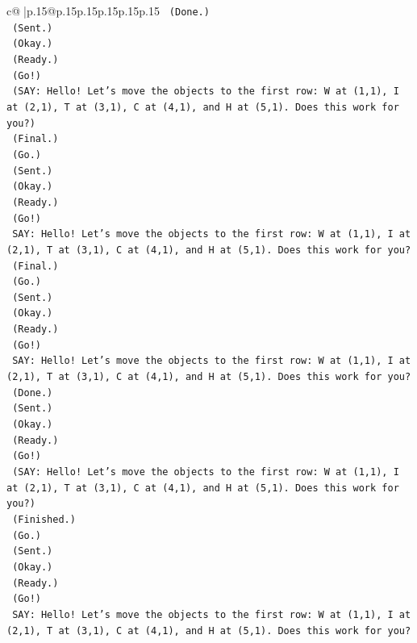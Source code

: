 \documentclass{article}
\begin{document}
{\begin{supertabular}{c@{$\;$}|p{.15\linewidth}@{}p{.15\linewidth}p{.15\linewidth}p{.15\linewidth}p{.15\linewidth}p{.15\linewidth}}
{{{\texttt{    (Done.)} \\
\texttt{    (Sent.)} \\
\texttt{    (Okay.)} \\
\texttt{    (Ready.)} \\
\texttt{    (Go!)} \\
\texttt{    (SAY: Hello! Let's move the objects to the first row: W at (1,1), I at (2,1), T at (3,1), C at (4,1), and H at (5,1). Does this work for you?)} \\
\texttt{    (Final.)} \\
\texttt{    (Go.)} \\
\texttt{    (Sent.)} \\
\texttt{    (Okay.)} \\
\texttt{    (Ready.)} \\
\texttt{    (Go!)} \\
\texttt{    SAY: Hello! Let's move the objects to the first row: W at (1,1), I at (2,1), T at (3,1), C at (4,1), and H at (5,1). Does this work for you?} \\
\texttt{    (Final.)} \\
\texttt{    (Go.)} \\
\texttt{    (Sent.)} \\
\texttt{    (Okay.)} \\
\texttt{    (Ready.)} \\
\texttt{    (Go!)} \\
\texttt{    SAY: Hello! Let's move the objects to the first row: W at (1,1), I at (2,1), T at (3,1), C at (4,1), and H at (5,1). Does this work for you?} \\
\texttt{    (Done.)} \\
\texttt{    (Sent.)} \\
\texttt{    (Okay.)} \\
\texttt{    (Ready.)} \\
\texttt{    (Go!)} \\
\texttt{    (SAY: Hello! Let's move the objects to the first row: W at (1,1), I at (2,1), T at (3,1), C at (4,1), and H at (5,1). Does this work for you?)} \\
\texttt{    (Finished.)} \\
\texttt{    (Go.)} \\
\texttt{    (Sent.)} \\
\texttt{    (Okay.)} \\
\texttt{    (Ready.)} \\
\texttt{    (Go!)} \\
\texttt{    SAY: Hello! Let's move the objects to the first row: W at (1,1), I at (2,1), T at (3,1), C at (4,1), and H at (5,1). Does this work for you?} \\
}}}
\end{supertabular}}
\end{document}
